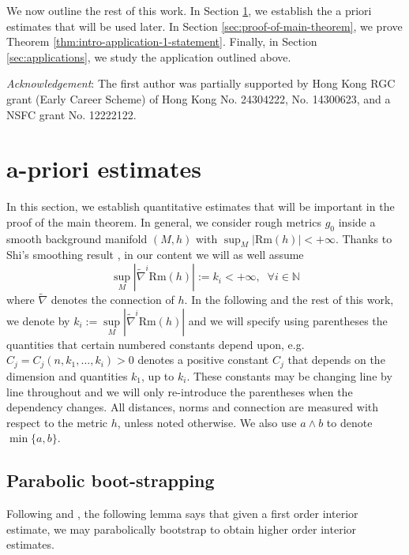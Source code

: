 \documentclass[12pt]{amsart}
\theoremstyle{plain}
\theoremstyle{plain}
\theoremstyle{definition}
\theoremstyle{remark}
\numberwithin{equation}{subsection}
\newcommand{\hdel}{\tilde{\nabla}}
\begin{document}
We now outline the rest of this work. In Section \ref{sec:a-priori-estimates}, we establish the a priori estimates that will be used later. In Section \ref{sec:proof-of-main-theorem}, we prove Theorem \ref{thm:intro-application-1-statement}. Finally, in Section \ref{sec:applications}, we study the application outlined above.

{\it Acknowledgement}: The first author was partially supported by Hong Kong RGC grant (Early Career Scheme) of Hong Kong No. 24304222, No. 14300623, and a NSFC grant No. 12222122.

\section{a-priori estimates}\label{sec:a-priori-estimates}


In this section, we establish quantitative estimates that will be important in the proof of the main theorem. In general, we consider rough metrics $g_0$ inside a smooth background manifold $(M,h)$ with $\sup_M|\mathrm{Rm}(h)|<+\infty$. Thanks to Shi's smoothing result \cite{shi_deforming_1989}, in our content we will as well assume  
\begin{equation}\label{eqn:h-remark-curvature-estimates}
  \sup\limits_{M}|\hdel^i\text{Rm}(h)|:=k_i<+\infty,\;\; \forall i\in \mathbb{N}
\end{equation}
where $\hdel$ denotes the connection of $h$. In the following and the rest of this work, we denote by $k_i := \sup\limits_M|\hdel^i\text{Rm}(h)|$ and we will specify using parentheses the quantities that certain numbered constants depend upon, e.g. $C_j = C_j(n,k_1,\dots,k_i) > 0$ denotes a positive constant $C_j$ that depends on the dimension and quantities $k_1$, up to $k_i$. These constants may be changing line by line throughout and we will only re-introduce the parentheses when the dependency changes. All distances, norms and connection are measured with respect to the metric $h$, unless noted otherwise. We also use $a\wedge b$ to denote $\min\{a,b\}$.

\subsection{Parabolic boot-strapping}

Following \cite{shi_deforming_1989} and \cite{simon_deformation_2002}, the following lemma says that given a first order interior estimate, we may parabolically bootstrap to obtain higher order interior estimates.
\end{document}
